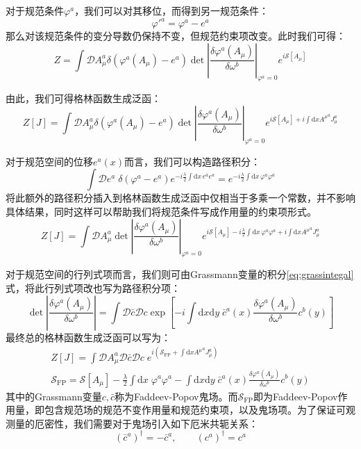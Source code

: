 对于规范条件$\varphi^a$，我们可以对其移位，而得到另一规范条件：
\begin{equation}
	{\varphi'}^a=\varphi^a-e^a
\end{equation}
那么对该规范条件的变分导数仍保持不变，但规范约束项改变。此时我们可得：
\begin{equation}
	Z=\int\mathcal{D}A^a_\mu\delta(\varphi^a(A_\mu)-e^a)\det\left|\frac{\delta\varphi^a(A_\mu)}{\delta \omega^b}\right|_{\varphi^a=0}e^{i\mathcal{S}[A_\mu]}
\end{equation}

由此，我们可得格林函数生成泛函：
\begin{equation}
	Z[J]=\int\mathcal{D}A^a_\mu\delta(\varphi^a(A_\mu)-e^a)\det\left|\frac{\delta\varphi^a(A_\mu)}{\delta \omega^b}\right|_{\varphi^a=0}e^{i\mathcal{S}[A_\mu]+i\int\mathrm{d}x {A^\mu}^aJ_\mu^a}
\end{equation}

对于规范空间的位移$e^a(x)$而言，我们可以构造路径积分：
\begin{equation}
	\int\mathcal{D}e^a\;\delta(\varphi^a-e^a)e^{-i\frac{\lambda}{2}\int\mathrm{d}x\,e^a e^a}=e^{-i\frac{\lambda}{2}\int\mathrm{d}x\,\varphi^a\varphi^a}
\end{equation}
将此额外的路径积分插入到格林函数生成泛函中仅相当于多乘一个常数，并不影响具体结果，同时这样可以帮助我们将规范条件写成作用量的约束项形式。
\begin{equation}
	Z[J]=\int\mathcal{D}A^a_\mu\det\left|\frac{\delta\varphi^a(A_\mu)}{\delta \omega^b}\right|_{\varphi^a=0}e^{i\mathcal{S}[A_\mu]-i\frac{\lambda}{2}\int\mathrm{d}x\,\varphi^a\varphi^a+i\int\mathrm{d}x {A^\mu}^aJ_\mu^a}
\end{equation}

对于规范空间的行列式项而言，我们则可由Grassmann变量的积分\eqref{eq:grassintegal}式，将此行列式项改也写为路径积分项：
\begin{equation}
	\det\left|\frac{\delta\varphi^a(A_\mu)}{\delta \omega^b}\right|=\int\mathcal{D}\bar{c}\mathcal{D}c \exp\left[{-i\int\mathrm{d}x\mathrm{d}y\;\bar{c}^a(x)\frac{\delta\varphi^a(A_\mu)}{\delta \omega^b}c^b(y)}\right]
\end{equation}
最终总的格林函数生成泛函可以写为：
\begin{gather}
	Z[J]=\int\mathcal{D}A^a_\mu\mathcal{D}\bar{c}\mathcal{D}c\;e^{i(\mathcal{S}_{\text{FP}}+\int\mathrm{d}x{A^\mu}^aJ_\mu^a)}\\
	\mathcal{S}_{\text{FP}}=\mathcal{S}[A_\mu]-\frac{\lambda}{2}\int\mathrm{d}x\;\varphi^a\varphi^a-\int\mathrm{d}x\mathrm{d}y\;\bar{ c}^a(x)\frac{\delta\varphi^a(A_\mu)}{\delta \omega^b} c^b(y)
\end{gather}
其中的Grassmann变量$ c,\bar{ c}$称为Faddeev-Popov鬼场。而$\mathcal{S}_{\text{FP}}$即为Faddeev-Popov作用量，即包含规范场的规范不变作用量和规范约束项，以及鬼场项。为了保证可观测量的厄密性，我们需要对于鬼场引入如下厄米共轭关系：
\begin{equation}
	(\bar{ c}^a)^\dagger=-\bar{ c}^a,\qquad( c^a)^\dagger= c^a
\end{equation}

